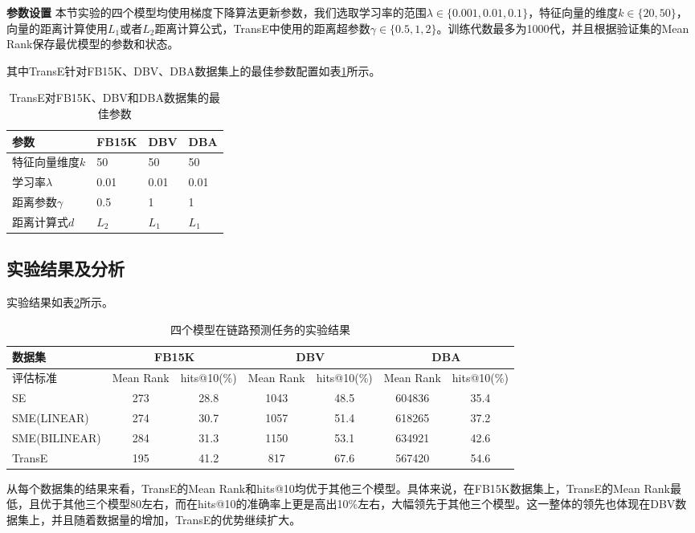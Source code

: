 \textbf{参数设置}\qquad
本节实验的四个模型均使用梯度下降算法更新参数，我们选取学习率的范围$\lambda \in \{0.001,0.01,0.1\}$，特征向量的维度$k \in \{20,50\}$，向量的距离计算使用$L_1$或者$L_2$距离计算公式，TransE中使用的距离超参数$\gamma \in \{0.5, 1, 2\}$。训练代数最多为1000代，并且根据验证集的Mean Rank保存最优模型的参数和状态。

其中TransE针对FB15K、DBV、DBA数据集上的最佳参数配置如表\ref{optimal_config}所示。
\begin{table}[H]
\centering
\caption{TransE对FB15K、DBV和DBA数据集的最佳参数}
\begin{tabular}{llll}
\toprule
参数 & FB15K & DBV & DBA \\
\midrule
特征向量维度$k$ & 50 & 50 & 50 \\
学习率$\lambda$ & 0.01 &  0.01 &  0.01 \\
距离参数$\gamma$ & 0.5 & 1 & 1 \\
距离计算式$d$ & $L_2$ & $L_1$ & $L_1$\\
\bottomrule
\end{tabular}
\label{optimal_config}
\end{table}

\subsection{实验结果及分析}
实验结果如表\ref{results}所示。
\begin{table}[H]
\centering
\caption{四个模型在链路预测任务的实验结果}
\begin{tabular}{lcccccc}
\toprule
数据集 & \multicolumn{2}{c}{FB15K} & \multicolumn{2}{c}{DBV} & \multicolumn{2}{c}{DBA} \\
\midrule
评估标准 & Mean Rank & hits@10(\%) & Mean Rank & hits@10(\%) & Mean Rank & hits@10(\%) \\
\midrule
SE & 273 & 28.8 & 1043 & 48.5 &  604836 & 35.4\\
SME(LINEAR) & 274 & 30.7 &  1057 & 51.4 & 618265 & 37.2 \\
SME(BILINEAR) & 284 & 31.3 &  1150 & 53.1 & 634921 & 42.6 \\
\midrule
TransE & 195 & 41.2 &  817 & 67.6 & 567420 & 54.6 \\
\bottomrule
\end{tabular}
\label{results}
\end{table}

从每个数据集的结果来看，TransE的Mean Rank和hits@10均优于其他三个模型。具体来说，在FB15K数据集上，TransE的Mean Rank最低，且优于其他三个模型80左右，而在hits@10的准确率上更是高出10\%左右，大幅领先于其他三个模型。这一整体的领先也体现在DBV数据集上，并且随着数据量的增加，TransE的优势继续扩大。

